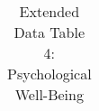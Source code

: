 \begin{longtable}{llcccccccccc}
\caption{Extended Data Table 4: Psychological Well-Being} \label{tab:pap__b4z} \\                                                                                                                                                                                                                                                                                                                                                                                                                                                                                                                                                                                                                                                                                                                                                                                                                                 
\hline \hline                                                                                                                                                                                                                                                                                                                                                                                                                                                                                                                                                                                                                                                                                                                                                                                                                                                                                                     

\end{longtable}
